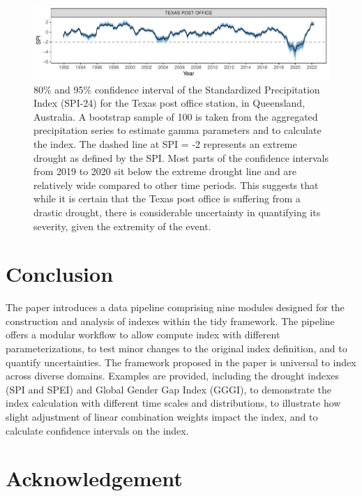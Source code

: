 \documentclass[
]{interact}
\begin{document}
\begin{figure}

{\centering \includegraphics{tidyindex_files/figure-pdf/fig-conf-interval-1.pdf}

}

\caption{\label{fig-conf-interval}80\% and 95\% confidence interval of
the Standardized Precipitation Index (SPI-24) for the Texas post office
station, in Queensland, Australia. A bootstrap sample of 100 is taken
from the aggregated precipitation series to estimate gamma parameters
and to calculate the index. The dashed line at SPI = -2 represents an
extreme drought as defined by the SPI. Most parts of the confidence
intervals from 2019 to 2020 sit below the extreme drought line and are
relatively wide compared to other time periods. This suggests that while
it is certain that the Texas post office is suffering from a drastic
drought, there is considerable uncertainty in quantifying its severity,
given the extremity of the event.}

\end{figure}

\hypertarget{conclusion}{%
\section{Conclusion}\label{conclusion}}

The paper introduces a data pipeline comprising nine modules designed
for the construction and analysis of indexes within the tidy framework.
The pipeline offers a modular workflow to allow compute index with
different parameterizations, to test minor changes to the original index
definition, and to quantify uncertainties. The framework proposed in the
paper is universal to index across diverse domains. Examples are
provided, including the drought indexes (SPI and SPEI) and Global Gender
Gap Index (GGGI), to demonstrate the index calculation with different
time scales and distributions, to illustrate how slight adjustment of
linear combination weights impact the index, and to calculate confidence
intervals on the index.

\hypertarget{acknowledgement}{%
\section{Acknowledgement}\label{acknowledgement}}
\end{document}
